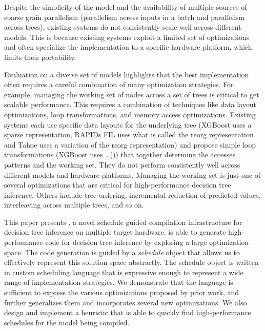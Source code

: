 Despite the simplicity of the model and the availability of multiple sources of coarse grain parallelism (parallelism across inputs in a batch and parallelism across trees), existing systems do not consistently scale well across different models. 
This is because existing systems exploit a limited set of optimizations and often specialize the implementation to a specific hardware platform, which limits their portability. 

Evaluation on a diverse set of models highlights that the best implementation often requires a careful combination of many optimization strategies. For example, managing the working set of nodes across a set of trees is critical to get scalable performance. This requires a combination of techniques like data layout optimizations, loop transformations, and memory access optimizations. Existing systems each use specific data layouts for the underlying tree (XGBoost uses a sparse representation, RAPIDs FIL uses what is called the reorg representation 
and Tahoe uses a variation of the reorg representation) and propose simple loop transformations (XGBoost uses \dots()) that together determine the accesses patterns and the working set. They do not perform consistently well across different models and hardware platforms.
Managing the working set is just one of several optimizations that are critical for high-performance decision tree inference.
 Others include tree ordering,  incremental reduction of predicted values, interleaving across multiple trees, and so on.

This paper presents \Treebeard{}, a novel schedule guided compilation infrastructure for decision tree inference on multiple target hardware. \Treebeard{} is able to generate high-performance code for decision tree inference by exploring a large optimization space. The code generation is guided by a \emph{schedule} object that allows us to effectively represent this solution space abstractly. The schedule object is written in \Treebeard{} custom scheduling language that is expressive enough to represent a wide range of implementation strategies. We demonstrate that the language is sufficient to express the various optimizations proposed by prior work, and further generalizes them and incorporates several new optimizations. We also design and implement a heuristic that is able to quickly find high-performance schedules for the model being compiled.
